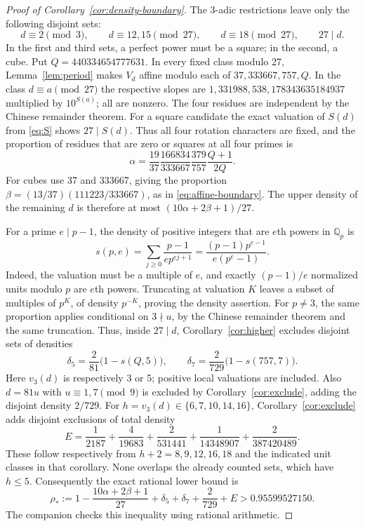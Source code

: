 \documentclass[10pt]{article}
\newcommand{\Q}{\mathbb Q}
\begin{document}
\begin{proof}[Proof of Corollary~\ref{cor:density-boundary}]
The 3-adic restrictions leave only the following disjoint sets:
\[
 d\equiv2\pmod3,\qquad d\equiv12,15\pmod{27},\qquad
 d\equiv18\pmod{27},\qquad 27\mid d.
\]
In the first and third sets, a perfect power must be a square; in the second,
a cube. Put $Q=440334654777631$. In every fixed class modulo 27,
Lemma~\ref{lem:period} makes $V_d$ affine modulo each of
$37,333667,757,Q$. In the class $d\equiv a\pmod{27}$ the respective slopes
are $1,331988,538,178343635184937$ multiplied by $10^{S(a)}$;
all are nonzero.
The four residues are independent by the Chinese remainder theorem.
For a square candidate the exact valuation of $S(d)$ from \eqref{eq:S}
shows $27\mid S(d)$. Thus all four rotation characters are fixed,
and the proportion of residues that are zero or squares at all four primes is
\[
 \alpha=\frac{19}{37}\frac{166834}{333667}
           \frac{379}{757}\frac{Q+1}{2Q}.
\]
For cubes use 37 and 333667, giving the proportion
$\beta=(13/37)(111223/333667)$, as in \eqref{eq:affine-boundary}.
The upper density of the remaining $d$ is therefore at most
$(10\alpha+2\beta+1)/27$.

For a prime $e\mid p-1$, the density of positive integers that are
$e$th powers in $\Q_p$ is
\[
 s(p,e)=\sum_{j\ge0}\frac{p-1}{e p^{ej+1}}
       =\frac{(p-1)p^{e-1}}{e(p^e-1)}.
\]
Indeed, the valuation must be a multiple of $e$, and exactly $(p-1)/e$
normalized units modulo $p$ are $e$th powers. Truncating at valuation $K$
leaves a subset of multiples of $p^K$, of density $p^{-K}$, proving the
density assertion. For $p\ne3$, the same proportion applies conditional on
$3\nmid u$, by the Chinese remainder theorem and the same truncation.
Thus, inside $27\mid d$, Corollary~\ref{cor:higher} excludes disjoint sets
of densities
\[
 \delta_5=\frac2{81}\bigl(1-s(Q,5)\bigr),\qquad
 \delta_7=\frac2{729}\bigl(1-s(757,7)\bigr).
\]
Here $v_3(d)$ is respectively 3 or 5; positive local valuations are included.
Also $d=81u$ with $u\equiv1,7\pmod9$ is excluded by
Corollary~\ref{cor:exclude}, adding the disjoint density $2/729$.
For $h=v_3(d)\in\{6,7,10,14,16\}$, Corollary~\ref{cor:exclude}
adds disjoint exclusions of total density
\[
 E=\frac1{2187}+\frac4{19683}+\frac2{531441}
        +\frac1{14348907}+\frac2{387420489}.
\]
These follow respectively from $h+2=8,9,12,16,18$ and the indicated
unit classes in that corollary. None overlaps the already counted sets,
which have $h\le5$. Consequently the exact rational lower bound is
\[
 \rho_*:=1-\frac{10\alpha+2\beta+1}{27}
              +\delta_5+\delta_7+\frac2{729}+E
       >0.95599527150.
\]
The companion  checks this inequality
using rational arithmetic.\qedhere
\end{proof}
\end{document}
